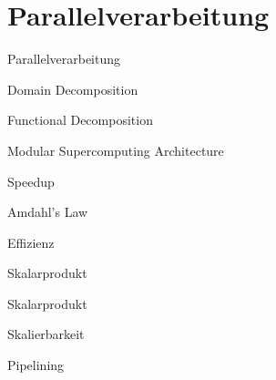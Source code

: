 \section{Parallelverarbeitung}

\begin{defi}{Parallelverarbeitung}

\end{defi}

\begin{defi}[Parallelverarbeitung]{Domain Decomposition}

\end{defi}

\begin{defi}[Parallelverarbeitung]{Functional Decomposition}

\end{defi}

\begin{bonus}{Modular Supercomputing Architecture}

\end{bonus}

\begin{defi}{Speedup}

\end{defi}

\begin{defi}{Amdahl's Law}

\end{defi}

\begin{defi}{Effizienz}

\end{defi}

\begin{example}[Speedup]{Skalarprodukt}

\end{example}

\begin{example}[Effizienz]{Skalarprodukt}

\end{example}

\begin{defi}{Skalierbarkeit}

\end{defi}

\begin{defi}{Pipelining}

\end{defi}